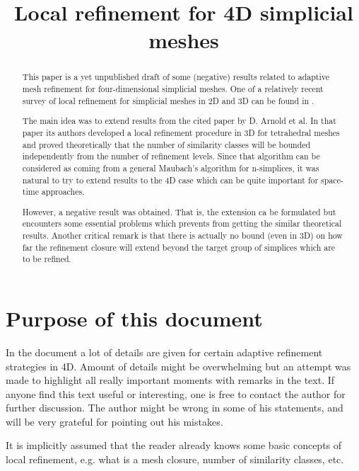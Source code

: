 \documentclass[a4paper,12pt]{amsart}
\title[Local refinement in 4D] 
{Local refinement for 4D simplicial meshes}
\numberwithin{equation}{section}
\begin{document}
 
\begin{abstract}
This paper is a yet unpublished draft of some (negative) results related to adaptive mesh refinement for four-dimensional simplicial meshes. One of a relatively recent survey of local refinement for simplicial meshes in 2D and 3D can be found in \cite{survey}.

The main idea was to extend results from the cited paper by D. Arnold et al. In that paper its authors developed a local refinement procedure in 3D for tetrahedral meshes and proved theoretically that the number of similarity classes will be bounded independently from the number of refinement levels.
Since that algorithm can be considered as coming from a general Maubach's algorithm for n-simplices, it was natural to try to extend results to the 4D case which can be quite important for space-time approaches.

However, a negative result was obtained. That is, the extension ca be formulated but encounters some essential problems which prevents from getting the similar theoretical results. Another critical remark is that there is actually no bound (even in 3D) on how far the refinement closure will extend beyond the target group of simplices which are to be refined.

\end{abstract}
\maketitle

\section{Purpose of this document}
In the document a lot of details are given for  certain adaptive refinement strategies in 4D. Amount of details might be overwhelming but an attempt was made to highlight all really important moments with remarks in the text. If anyone find this text useful or interesting, one is free to contact the author for further discussion. The author might be wrong in some of his statements, and will be very grateful for pointing out his mistakes.

It is implicitly assumed that the reader already knows some basic concepts of local refinement, e.g. what is a mesh closure, number of similarity classes, etc. 
\end{document}
